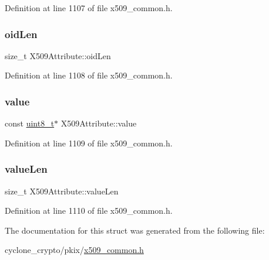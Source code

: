 Definition at line 1107 of file x509\+\_\+common.\+h.

\mbox{\label{structX509Attribute_ac03ef355131a4835e1350f9da7819ca5}} 
\subsubsection{\texorpdfstring{oid\+Len}{oidLen}}
{\footnotesize\ttfamily size\+\_\+t X509\+Attribute\+::oid\+Len}



Definition at line 1108 of file x509\+\_\+common.\+h.

\mbox{\label{structX509Attribute_a4285683a21f1b17553c16d2372f9ea97}} 
\subsubsection{\texorpdfstring{value}{value}}
{\footnotesize\ttfamily const \hyperlink{stdint_8h_aba7bc1797add20fe3efdf37ced1182c5}{uint8\+\_\+t}$\ast$ X509\+Attribute\+::value}



Definition at line 1109 of file x509\+\_\+common.\+h.

\mbox{\label{structX509Attribute_a27cbb916c6731d4c1c26e48d95ba1f0c}} 
\subsubsection{\texorpdfstring{value\+Len}{valueLen}}
{\footnotesize\ttfamily size\+\_\+t X509\+Attribute\+::value\+Len}



Definition at line 1110 of file x509\+\_\+common.\+h.



The documentation for this struct was generated from the following file\+:\begin{DoxyCompactItemize}
\item 
cyclone\+\_\+crypto/pkix/\hyperlink{pkix_2x509__common_8h}{x509\+\_\+common.\+h}\end{DoxyCompactItemize}
